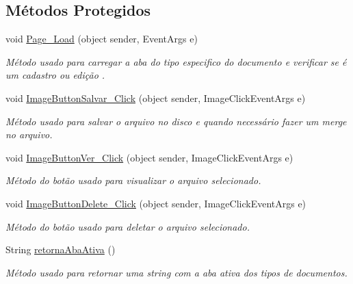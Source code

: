 \subsection*{Métodos Protegidos}
\begin{DoxyCompactItemize}
\item 
void \hyperlink{class_sistema_r_h_1_1tab__default_a6f7bdf41b1f65136eb16431718232486}{Page\_\-Load} (object sender, EventArgs e)
\begin{DoxyCompactList}\small\item\em Método usado para carregar a aba do tipo especifico do documento e verificar se é um cadastro ou edição . \item\end{DoxyCompactList}\item 
void \hyperlink{class_sistema_r_h_1_1tab__default_a673703cbe9e36170af1678d1921c8b32}{ImageButtonSalvar\_\-Click} (object sender, ImageClickEventArgs e)
\begin{DoxyCompactList}\small\item\em Método usado para salvar o arquivo no disco e quando necessário fazer um merge no arquivo. \item\end{DoxyCompactList}\item 
void \hyperlink{class_sistema_r_h_1_1tab__default_ae4ec4900b7c4224ca747059fc54294c9}{ImageButtonVer\_\-Click} (object sender, ImageClickEventArgs e)
\begin{DoxyCompactList}\small\item\em Método do botão usado para visualizar o arquivo selecionado. \item\end{DoxyCompactList}\item 
void \hyperlink{class_sistema_r_h_1_1tab__default_aec381d82705001e007b6975a51f9e6f2}{ImageButtonDelete\_\-Click} (object sender, ImageClickEventArgs e)
\begin{DoxyCompactList}\small\item\em Método do botão usado para deletar o arquivo selecionado. \item\end{DoxyCompactList}\item 
String \hyperlink{class_sistema_r_h_1_1tab__default_a964b5ec3554c39674019836fe98c38f4}{retornaAbaAtiva} ()
\begin{DoxyCompactList}\small\item\em Método usado para retornar uma string com a aba ativa dos tipos de documentos. \item\end{DoxyCompactList}\item 

\end{DoxyCompactItemize}

